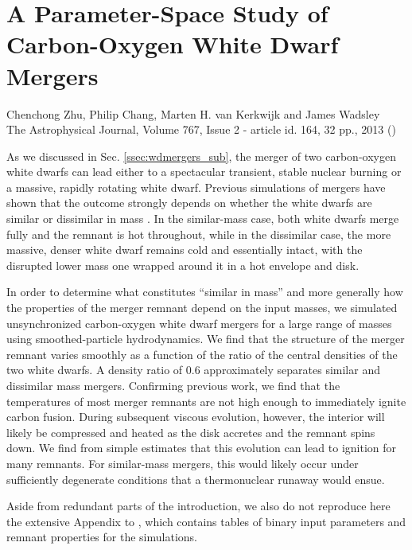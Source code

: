 \chapter{A Parameter-Space Study of Carbon-Oxygen White Dwarf Mergers}
\label{ch:ch2}

\begin{center}
\begin{minipage}[c]{4.75in}
Chenchong Zhu, Philip Chang, Marten H. van Kerkwijk and James Wadsley\\
The Astrophysical Journal, Volume 767, Issue 2 - article id. 164, 32 pp., 2013 (\citeal{zhu+13})
\vspace{2em}
\end{minipage}
\end{center}

As we discussed in Sec. \ref{ssec:wdmergers_sub}, the merger of two carbon-oxygen white dwarfs can lead either to a spectacular transient, stable nuclear burning or a massive, rapidly rotating white dwarf.  Previous simulations of mergers have shown that the outcome strongly depends on whether the white dwarfs are similar or dissimilar in mass \citep{loreig09}.  In the similar-mass case, both white dwarfs merge fully and the remnant is hot throughout, while in the dissimilar case, the more massive, denser white dwarf remains cold and essentially intact, with the disrupted lower mass one wrapped around it in a hot envelope and disk.

In order to determine what constitutes ``similar in mass'' and more generally how the properties of the merger remnant depend on the input masses, we simulated unsynchronized carbon-oxygen white dwarf mergers for a large range of masses using smoothed-particle hydrodynamics.  We find that the structure of the merger remnant varies smoothly as a function of the ratio of the central densities of the two white dwarfs.  A density ratio of 0.6 approximately separates similar and dissimilar mass mergers.  Confirming previous work, we find that the temperatures of most merger remnants are not high enough to immediately ignite carbon fusion.  During subsequent viscous evolution, however, the interior will likely be compressed and heated as the disk accretes and the remnant spins down.  We find from simple estimates that this evolution can lead to ignition for many remnants.  For similar-mass mergers, this would likely occur under sufficiently degenerate conditions that a thermonuclear runaway would ensue.

Aside from redundant parts of the introduction, we also do not reproduce here the extensive Appendix to \citeal{zhu+13}, which contains tables of binary input parameters and remnant properties for the simulations.
